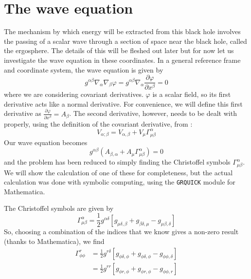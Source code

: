 \documentclass[11pt]{article}
\numberwithin{equation}{section}
\numberwithin{figure}{section}
\numberwithin{table}{section}
\begin{document}
\section{The wave equation}\label{sec:Wave Equation}
\par The mechanism by which energy will be extracted from this black hole involves the passing of a scalar wave through a section of space near the black hole, called the ergosphere. The details of this will be fleshed out later but for now let us investigate the wave equation in these coordinates. In a general reference frame and coordinate system, the wave equation is given by
\begin{equation}
    g^{\alpha\beta}\nabla_\alpha\nabla_\beta \varphi=g^{\alpha\beta}\nabla_\alpha\frac{\partial \varphi}{\partial x^\beta}=0
    \label{eqn:general wave equation}
\end{equation}
where we are considering covariant derivatives. $\varphi$ is a scalar field, so its first derivative acts like a normal derivative. For convenience, we will define this first derivative as $\frac{\partial \varphi}{\partial x^\beta} = A_\beta$. The second derivative, however, needs to be dealt with properly, using the definition of the covariant derivative, from \cite{dunsby}:
\begin{equation}
    V_{\alpha;\beta}=V_{\alpha,\beta}+V_\mu\Gamma^\alpha_{\mu\beta}
    \label{eqn:covariant derivative}
\end{equation}
Our wave equation becomes
\begin{equation*}
    g^{\alpha\beta}\left(A_{\beta,\alpha}+A_\mu\Gamma^\alpha_{\mu\beta}\right)=0
\end{equation*}
and the problem has been reduced to simply finding the Christoffel symbols $\Gamma^\alpha_{\mu\beta}$. We will show the calculation of one of these for completeness, but the actual calculation was done with symbolic computing, using the \texttt{GRQUICK} module for Mathematica.
\par The Christoffel symbols are given by 
\begin{equation}
    \Gamma^\alpha_{\mu\beta}=\frac{1}{2}g^{\alpha\delta}[g_{\mu\delta,\beta}+g_{\beta\delta,\mu}-g_{\mu\beta,\delta}]
    \label{eqn:Christoffel symbol}
\end{equation}
So, choosing a combination of the indices that we know gives a non-zero result (thanks to Mathematica), we find
\begin{align*}
    \Gamma^r_{\phi\phi}&=\frac{1}{2}g^{r\delta}[g_{\phi\delta,\phi}+g_{\phi\delta,\phi}-g_{\phi\phi,\delta}]\\
    &=\frac{1}{2}g^{rr}[g_{\phi r,\phi}+g_{\phi r,\phi}-g_{\phi\phi,r}]
\end{align*}
\end{document}
